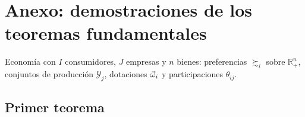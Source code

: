 \documentclass[11pt]{article}
\begin{document}
\section{Anexo: demostraciones de los teoremas fundamentales}\label{anexo:demostraciones}

Economía con $I$ consumidores, $J$ empresas y $n$ bienes\nocite{MasColellWhinstonGreen1995}: preferencias $\succsim_i$ sobre $\mathbb{R}^n_+$, conjuntos de producción $\mathcal{Y}_j$, dotaciones $\vec{\omega}_i$ y participaciones $\theta_{ij}$.

\subsection{Primer teorema}\label{anexo:demostracion-primero}
\end{document}
